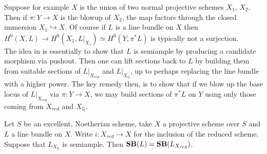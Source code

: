 Suppose for example $X$ is the union of two normal projective schemes $X_{1}$, $X_{2}$. Then if $\pi:Y \to X$ is the blowup of $X_{2}$, the map factors through the closed immersion $X_{1} \hookrightarrow X$. Of course if $L$ is a line bundle on $X$ then $H^{0}(X,L) \to H^{0}(X_{1},L|_{X_{1}})\simeq H^{0}(Y,\pi^{*}L)$ is typically not a surjection.\\

 The idea in \cite[Thereom 1.10]{witaszek2020keels} is essentially to show that $L$ is semiample by producing a candidate morphism via pushout. Then one can lift sections back to $L$ by building them from suitable sections of $L|_{X_{red}}$ and $L|_{X_{\mathbb{Q}}}$, up to perhaps replacing the line bundle with a higher power. The key remedy then, is to show that if we blow up the base locus of $L|_{X_{red}}$ via $\pi:Y \to X$, we may build sections of $\pi^{*}L$ on $Y$ using only those coming from $X_{red}$ and $X_{\mathbb{Q}}$.\\

\begin{theorem}\label{BaseRed}
		Let $S$ be an excellent, Noetherian scheme, take $X$ a projective scheme over $S$ and $L$ a line bundle on $X$. Write $i:X_{red} \to X$ for the inclusion of the reduced scheme. Suppose that $L_{X_{\mathbb{Q}}}$ is semiample. Then $\mathbf{SB}(L)=\mathbf{SB}(L_{X_{red}})$.
\end{theorem}

